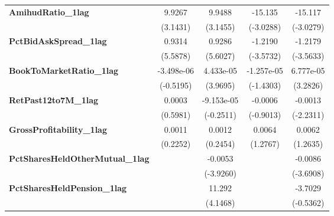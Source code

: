 {\begin{longtable}{>{\bfseries}lcccc}
\textbf{AmihudRatio\_1lag}                 &       9.9267       &              9.9488             &      -15.135       &          -15.117            \\
\textbf{ }                                 &      (3.1431)      &             (3.1455)            &     (-3.0288)      &         (-3.0279)           \\
\textbf{PctBidAskSpread\_1lag}             &       0.9314       &              0.9286             &      -1.2190       &          -1.2179            \\
\textbf{ }                                 &      (5.5878)      &             (5.6027)            &     (-3.5732)      &         (-3.5633)           \\
\textbf{BookToMarketRatio\_1lag}           &     -3.498e-06     &            4.433e-05            &     -1.257e-05     &         6.777e-05           \\
\textbf{ }                                 &     (-0.5195)      &             (3.9695)            &     (-1.4303)      &          (3.2826)           \\
\textbf{RetPast12to7M\_1lag}               &       0.0003       &            -9.153e-05           &      -0.0006       &          -0.0013            \\
\textbf{ }                                 &      (0.5981)      &            (-0.2511)            &     (-0.9013)      &         (-2.2311)           \\
\textbf{GrossProfitability\_1lag}          &       0.0011       &              0.0012             &       0.0064       &           0.0062            \\
\textbf{ }                                 &      (0.2252)      &             (0.2454)            &      (1.2767)      &          (1.2635)           \\
\textbf{PctSharesHeldOtherMutual\_1lag}    &                    &             -0.0053             &                    &          -0.0086            \\
\textbf{ }                                 &                    &            (-3.9260)            &                    &         (-3.6908)           \\
\textbf{PctSharesHeldPension\_1lag}        &                    &              11.292             &                    &          -3.7029            \\
\textbf{ }                                 &                    &             (4.1468)            &                    &         (-0.5362)           \\

\end{longtable}}
